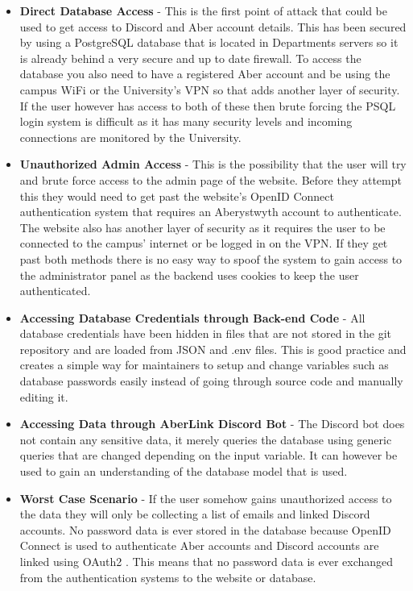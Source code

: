 \begin{itemize}
	\item \textbf{Direct Database Access} - This is the first point of attack that could be used to get access to Discord and Aber account details. This has been secured by using a PostgreSQL \cite{psql} database that is located in Departments servers so it is already behind a very secure and up to date firewall. To access the database you also need to have a registered Aber account and be using the campus WiFi or the University's VPN so that adds another layer of security. If the user however has access to both of these then brute forcing the PSQL login system is difficult as it has many security levels and incoming connections are monitored by the University.
	\item \textbf{Unauthorized Admin Access} - This is the possibility that the user will try and brute force access to the admin page of the website. Before they attempt this they would need to get past the website's OpenID Connect \cite{OpenID} authentication system that requires an Aberystwyth account to authenticate. The website also has another layer of security as it requires the user to be connected to the campus' internet or be logged in on the VPN. If they get past both methods there is no easy way to spoof the system to gain access to the administrator panel as the backend uses cookies to keep the user authenticated.
	\item \textbf{Accessing Database Credentials through Back-end Code} - All database credentials have been hidden in files that are not stored in the git repository and are loaded from JSON and .env files. This is good practice and creates a simple way for maintainers to setup and change variables such as database passwords easily instead of going through source code and manually editing it.
	\item \textbf{Accessing Data through AberLink Discord Bot} - The Discord bot does not contain any sensitive data, it merely queries the database using generic queries that are changed depending on the input variable. It can however be used to gain an understanding of the database model that is used.
	\item \textbf{Worst Case Scenario} - If the user somehow gains unauthorized access to the data they will only be collecting a list of emails and linked Discord accounts. No password data is ever stored in the database because  OpenID Connect \cite{OpenID} is used to authenticate Aber accounts and Discord accounts are linked using OAuth2 \cite{oauth2}. This means that no password data is ever exchanged from the authentication systems to the website or database.
\end{itemize}

